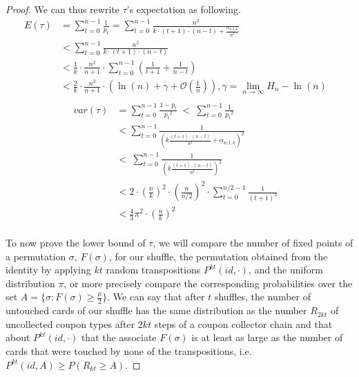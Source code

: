 \documentclass[english,oneside,twocolumn]{article}
\begin{document}
\begin{proof}
We can thus rewrite $\tau$'s expectation as following.
\begin{align*}
 E(\tau) &= \sum_{t=0}^{n-1} \frac{1}{p_{t}} = \sum_{t=0}^{n-1} \frac{n^2}{k \cdot (t+1)\cdot(n-t) + \frac{\alpha_{n,t,k}}{n^2}}&\\
 &< \sum_{t=0}^{n-1} \frac{n^2}{k \cdot (t+1)\cdot(n-t)}  &\\
 &< \frac{1}{k} \cdot \frac{n^2}{n+1} \cdot  \sum_{t=0}^{n-1} \left ( \frac{1}{t+1} + \frac{1}{n-t} \right ) &\\
 &< \frac{2}{k} \cdot \frac{n^2}{n+1} \cdot \left( \ln(n) + \gamma +\mathcal{O}(\frac{1}{n}) \right), \gamma = \lim_{n \to \infty} H_n - \ln(n)& \\
 \end{align*}
 \begin{align*}
 var(\tau) &= \sum_{t=0}^{n-1}\frac{1-p_t}{{p_t}^2}\ <\  \sum_{t=0}^{n-1}\frac{1}{{p_t}^2} &\\
 &< \sum_{t=0}^{n-1}\frac{1}{\left ( k \frac{(t+1)\cdot(n-t)}{n^2} + \alpha_{n,t,k}\right )^2}\\\
 &<\ \sum_{t=0}^{n-1} \frac{1 }{\left ( k \frac{(t+1)\cdot(n-t)}{n^2} \right )^2} &\\
 &< 2 \cdot \left (\frac{n}{k} \right )^2 \cdot \left (\frac{n}{n/2} \right )^2 \cdot \sum_{t=0}^{n/2-1} \frac{1}{(t+1)^2} &\\
 &< \frac{4}{3} \pi^2 \cdot \left (\frac{n}{k} \right )^2 
\end{align*}
\\

To now prove the lower bound of $\tau$, we will compare the number of fixed points of a permutation $\sigma$, $F(\sigma)$, for our shuffle, the permutation
obtained from the identity by applying $kt$ random transpositions $ P^{kt}(id, \cdot)$, and the uniform distribution $\pi$, or more precisely compare the corresponding probabilities over the set $A=\{\sigma : F(\sigma) \geq \frac{\mu}{2} \}$.
We can say that after $t$ shuffles, the number of untouched cards of our shuffle has the same distribution as the number $R_{2kt}$ of uncollected coupon types after $2kt$ steps of a coupon collector chain
and that about $ P^{kt}(id, \cdot)$ that the associate $F(\sigma)$ is at least as large as the number of cards that were touched by none of the transpositions, i.e. $P^{kt}(id,A) \geq P(R_{kt}\geq A) $.


\end{proof}
\end{document}
